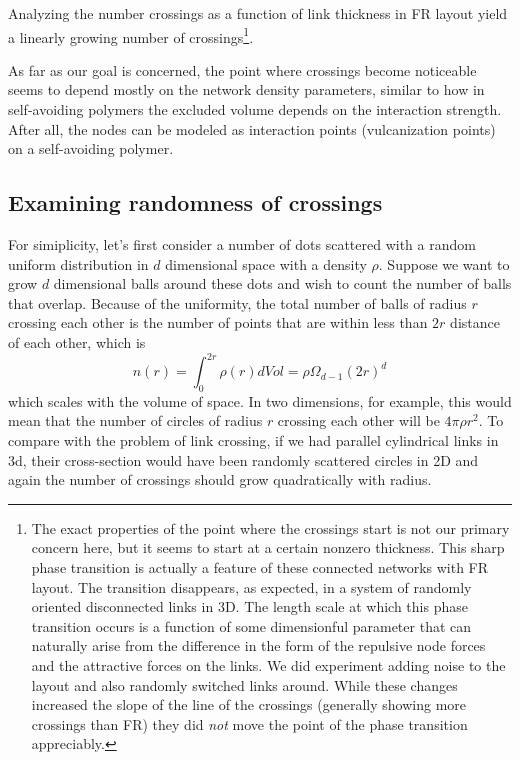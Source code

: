 \documentclass[nofootinbib,preprint,floatfix,titlepage,endfloats,superscriptaddress]{revtex4} %
\begin{document}
Analyzing the number crossings as a function of link thickness in FR layout yield a linearly growing number of crossings\footnote{The exact properties of the point where the crossings start is not our primary concern here, but it seems to start at a certain nonzero thickness. 
This sharp phase transition is actually a feature of these connected networks with FR layout. The transition disappears, as expected, in a system of randomly oriented disconnected links in 3D. The length scale at which this phase transition occurs is a function of some dimensionful parameter that can naturally arise from the difference in the form of the repulsive node forces and the attractive forces on the links. We did experiment adding noise to the layout and also randomly switched links around. While these changes increased the slope of the line of the crossings (generally showing more crossings than FR) they did {\em not} move the point of the phase transition appreciably.}. 
 
As far as our goal is concerned, the point where crossings become noticeable seems to depend mostly on the network density parameters, similar to how in self-avoiding polymers the excluded volume depends on the interaction strength. 
After all, the nodes can be modeled as interaction points (vulcanization points) on a self-avoiding polymer.  


\subsection{Examining randomness of crossings}
For simiplicity, let's first consider a number of dots scattered with a random uniform distribution in $d$ dimensional space with a density $\rho$. Suppose we want to grow $d$ dimensional balls around these dots and wish to count the number of balls that overlap. Because of the uniformity, the total number of balls of radius $r$ crossing each other is the number of points that are within less than $2r$ distance of each other, which is
\begin{equation}
    n(r) = \int_0^{2r} \rho(r) dVol=\rho \Omega_{d-1} (2r)^d  \label{eq:nr}
\end{equation}
which scales with the volume of space. In two dimensions, for example, this would mean that the number of circles of radius $r$ crossing each other will be $4\pi \rho r^2$. To compare with the problem of link crossing, if we had parallel cylindrical links in 3d, their cross-section would have been randomly scattered circles in 2D and again the number of crossings should grow quadratically with radius. 
\end{document}
